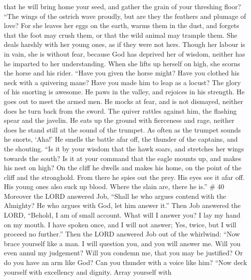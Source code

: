 that he will bring home your seed, and gather the grain of your
threshing floor?  ``The wings of the ostrich wave proudly,
but are they the feathers and plumage of love?  For she
leaves her eggs on the earth, warms them in the dust,  and
forgets that the foot may crush them, or that the wild animal may
trample them.  She deals harshly with her young ones, as if
they were not hers. Though her labour is in vain, she is without fear,
 because God has deprived her of wisdom, neither has he
imparted to her understanding.  When she lifts up herself
on high, she scorns the horse and his rider.  ``Have you
given the horse might? Have you clothed his neck with a quivering mane?
 Have you made him to leap as a locust? The glory of his
snorting is awesome.  He paws in the valley, and rejoices
in his strength. He goes out to meet the armed men.  He
mocks at fear, and is not dismayed, neither does he turn back from the
sword.  The quiver rattles against him, the flashing spear
and the javelin.  He eats up the ground with fierceness and
rage, neither does he stand still at the sound of the trumpet.
 As often as the trumpet sounds he snorts, `Aha!' He smells
the battle afar off, the thunder of the captains, and the shouting.
 ``Is it by your wisdom that the hawk soars, and stretches
her wings towards the south?  Is it at your command that
the eagle mounts up, and makes his nest on high?  On the
cliff he dwells and makes his home, on the point of the cliff and the
stronghold.  From there he spies out the prey. His eyes see
it afar off.  His young ones also suck up blood. Where the
slain are, there he is.'' \# 40  Moreover the LORD answered
Job,  ``Shall he who argues contend with the Almighty? He
who argues with God, let him answer it.''  Then Job answered
the LORD,  ``Behold, I am of small account. What will I
answer you? I lay my hand on my mouth.  I have spoken once,
and I will not answer; Yes, twice, but I will proceed no further.''
 Then the LORD answered Job out of the whirlwind:
 ``Now brace yourself like a man. I will question you, and
you will answer me.  Will you even annul my judgement? Will
you condemn me, that you may be justified?  Or do you have
an arm like God? Can you thunder with a voice like him? 
``Now deck yourself with excellency and dignity. Array yourself with
